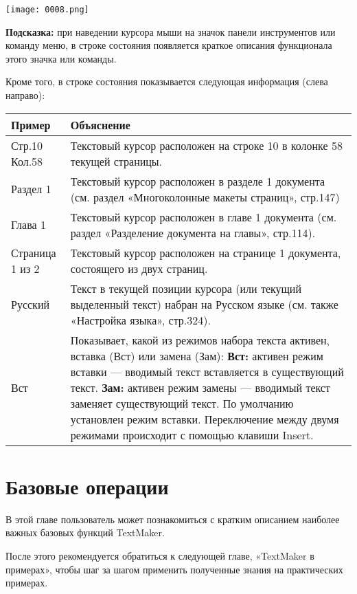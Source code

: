 \documentclass[a4paper,10pt]{article}
\begin{document}
\texttt{[image: 0008.png]}

\begin{mdframed}[backgroundcolor=blue!10]
\textbf{Подсказка:} при наведении курсора мыши на значок панели инструментов или команду меню, в строке состояния появляется краткое описания функционала этого значка или команды. 
\end{mdframed}

Кроме того, в строке состояния показывается следующая информация (слева направо):

\begin{center}
\begin{tabular}{ | m{4cm} | m{10cm} | }
\hline
 Пример & Объяснение \\ 
 \hline
 Стр.10 Кол.58 & Текстовый курсор расположен на строке 10 в колонке 58 текущей страницы. \\  
 \hline
 Раздел 1 & Текстовый курсор расположен в разделе 1 документа (см. раздел «Многоколонные макеты страниц», стр.147) \\
 \hline
 Глава 1 & Текстовый курсор расположен в главе 1 документа (см. раздел «Разделение документа на главы», стр.114). \\
 \hline
 Страница 1 из 2 & Текстовый курсор расположен на странице 1 документа, состоящего из двух страниц. \\
 \hline
 Русский & Текст в текущей позиции курсора (или текущий выделенный текст) набран на Русском языке (см. также «Настройка языка», стр.324).\\
 \hline
 Вст & Показывает, какой из режимов набора текста активен, вставка (Вст) или замена (Зам):
\textbf{Вст:} активен режим вставки — вводимый текст вставляется в существующий текст.
\textbf{Зам:} активен режим замены — вводимый текст заменяет существующий текст.
По умолчанию установлен режим вставки. Переключение между двумя режимами происходит с помощью клавиши Insert.\\
\hline
\end{tabular}
\end{center}

\section{Базовые операции}
В этой главе пользователь может познакомиться с кратким описанием наиболее важных базовых функций TextMaker. 

После этого рекомендуется обратиться к следующей главе, «TextMaker в примерах», чтобы шаг за шагом применить полученные знания на практических примерах.
\end{document}
